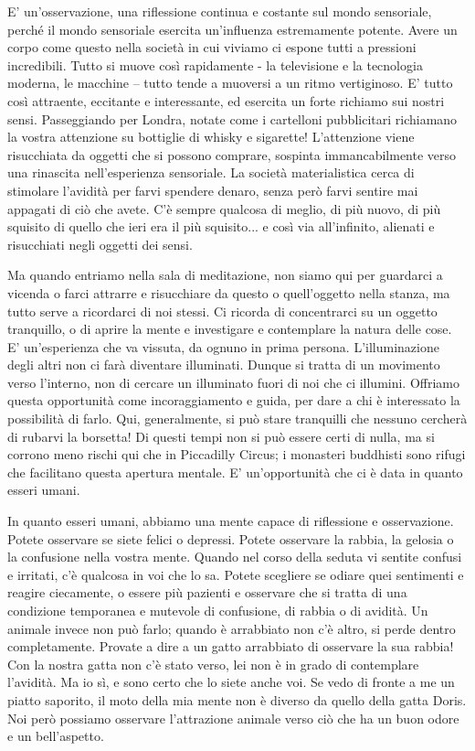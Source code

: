 E' un'osservazione, una riflessione continua e costante sul mondo
sensoriale, perché il mondo sensoriale esercita un'influenza
estremamente potente. Avere un corpo come questo nella società in cui
viviamo ci espone tutti a pressioni incredibili. Tutto si muove così
rapidamente - la televisione e la tecnologia moderna, le macchine –
tutto tende a muoversi a un ritmo vertiginoso. E' tutto così attraente,
eccitante e interessante, ed esercita un forte richiamo sui nostri
sensi. Passeggiando per Londra, notate come i cartelloni pubblicitari
richiamano la vostra attenzione su bottiglie di whisky e sigarette!
L'attenzione viene risucchiata da oggetti che si possono comprare,
sospinta immancabilmente verso una rinascita nell'esperienza sensoriale.
La società materialistica cerca di stimolare l'avidità per farvi
spendere denaro, senza però farvi sentire mai appagati di ciò che avete.
C'è sempre qualcosa di meglio, di più nuovo, di più squisito di quello
che ieri era il più squisito... e così via all'infinito, alienati e
risucchiati negli oggetti dei sensi.

Ma quando entriamo nella sala di meditazione, non siamo qui per
guardarci a vicenda o farci attrarre e risucchiare da questo o
quell'oggetto nella stanza, ma tutto serve a ricordarci di noi stessi.
Ci ricorda di concentrarci su un oggetto tranquillo, o di aprire la
mente e investigare e contemplare la natura delle cose. E' un'esperienza
che va vissuta, da ognuno in prima persona. L'illuminazione degli altri
non ci farà diventare illuminati. Dunque si tratta di un movimento verso
l'interno, non di cercare un illuminato fuori di noi che ci illumini.
Offriamo questa opportunità come incoraggiamento e guida, per dare a chi
è interessato la possibilità di farlo. Qui, generalmente, si può stare
tranquilli che nessuno cercherà di rubarvi la borsetta! Di questi tempi
non si può essere certi di nulla, ma si corrono meno rischi qui che in
Piccadilly Circus; i monasteri buddhisti sono rifugi che facilitano
questa apertura mentale. E' un'opportunità che ci è data in quanto
esseri umani.

In quanto esseri umani, abbiamo una mente capace di riflessione e
osservazione. Potete osservare se siete felici o depressi. Potete
osservare la rabbia, la gelosia o la confusione nella vostra mente.
Quando nel corso della seduta vi sentite confusi e irritati, c'è
qualcosa in voi che lo sa. Potete scegliere se odiare quei sentimenti e
reagire ciecamente, o essere più pazienti e osservare che si tratta di
una condizione temporanea e mutevole di confusione, di rabbia o di
avidità. Un animale invece non può farlo; quando è arrabbiato non c'è
altro, si perde dentro completamente. Provate a dire a un gatto
arrabbiato di osservare la sua rabbia! Con la nostra gatta non c'è stato
verso, lei non è in grado di contemplare l'avidità. Ma io sì, e sono
certo che lo siete anche voi. Se vedo di fronte a me un piatto saporito,
il moto della mia mente non è diverso da quello della gatta Doris. Noi
però possiamo osservare l'attrazione animale verso ciò che ha un buon
odore e un bell'aspetto.

